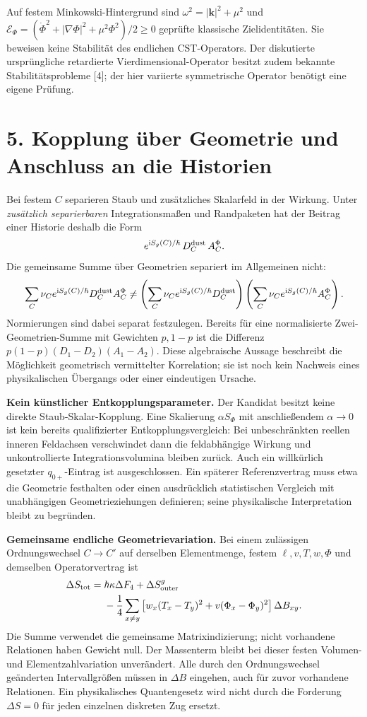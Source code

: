 \documentclass[10pt,a4paper]{article}
\newcommand{\ii}{\mathrm i}
\newcommand{\sect}[1]{\section*{\color{navy}#1}}
\begin{document}
Auf festem Minkowski-Hintergrund sind
$\omega^2=|\boldsymbol{k}|^2+\mu^2$ und
$\mathcal E_\Phi=(\dot\Phi^2+|\nabla\Phi|^2+\mu^2\Phi^2)/2\geq0$
geprüfte klassische Zielidentitäten. Sie beweisen keine Stabilität des
endlichen CST-Operators. Der diskutierte ursprüngliche retardierte
Vierdimensional-Operator besitzt zudem bekannte Stabilitätsprobleme [4];
der hier variierte symmetrische Operator benötigt eine eigene Prüfung.

\newpage
\sect{5. Kopplung über Geometrie und Anschluss an die Historien}
Bei festem $C$ separieren Staub und zusätzliches Skalarfeld in der Wirkung.
Unter \emph{zusätzlich separierbaren} Integrationsmaßen und Randpaketen
hat der Beitrag einer Historie deshalb die Form
\[
e^{\ii S_g(C)/\hbar}\,D_C^{\rm dust}\,A_C^\Phi.
\]
Die gemeinsame Summe über Geometrien separiert im Allgemeinen nicht:
\[
\sum_C\nu_Ce^{\ii S_g(C)/\hbar}D_C^{\rm dust}A_C^\Phi
\ne
\left(\sum_C\nu_Ce^{\ii S_g(C)/\hbar}D_C^{\rm dust}\right)
\left(\sum_C\nu_Ce^{\ii S_g(C)/\hbar}A_C^\Phi\right).
\]
Normierungen sind dabei separat festzulegen. Bereits für eine normalisierte
Zwei-Geometrien-Summe mit Gewichten $p,1-p$ ist die Differenz
$p(1-p)(D_1-D_2)(A_1-A_2)$. Diese algebraische Aussage beschreibt die
Möglichkeit geometrisch vermittelter Korrelation; sie ist noch kein
Nachweis eines physikalischen Übergangs oder einer eindeutigen Ursache.

\textbf{Kein künstlicher Entkopplungsparameter.}
Der Kandidat besitzt keine direkte Staub-Skalar-Kopplung. Eine Skalierung
$\alpha S_\Phi$ mit anschließendem $\alpha\to0$ ist kein bereits
qualifizierter Entkopplungsvergleich: Bei unbeschränkten reellen inneren
Feldachsen verschwindet dann die feldabhängige Wirkung und unkontrollierte
Integrationsvolumina bleiben zurück. Auch ein willkürlich gesetzter
$q_{0+}$-Eintrag ist ausgeschlossen. Ein späterer Referenzvertrag muss
etwa die Geometrie festhalten oder einen ausdrücklich statistischen
Vergleich mit unabhängigen Geometrieziehungen definieren; seine
physikalische Interpretation bleibt zu begründen.

\textbf{Gemeinsame endliche Geometrievariation.}
Bei einem zulässigen Ordnungswechsel $C\to C'$ auf derselben Elementmenge,
festem $\ell,v,T,w,\Phi$ und demselben Operatorvertrag ist
\[
\begin{aligned}
\Delta S_{\rm tot}={}&\hbar\kappa\Delta F_4+\Delta S^g_{\rm outer}\\
&-\frac14\sum_{x\ne y}
\left[w_x(T_x-T_y)^2+v(\Phi_x-\Phi_y)^2\right]\Delta B_{xy}.
\end{aligned}
\]
Die Summe verwendet die gemeinsame Matrixindizierung; nicht vorhandene
Relationen haben Gewicht null. Der Massenterm bleibt bei dieser
festen Volumen- und Elementzahlvariation unverändert.
Alle durch den Ordnungswechsel geänderten Intervallgrößen müssen in
$\Delta B$ eingehen, auch für zuvor vorhandene Relationen.
Ein physikalisches Quantengesetz wird nicht durch die Forderung
$\Delta S=0$ für jeden einzelnen diskreten Zug ersetzt.
\end{document}
